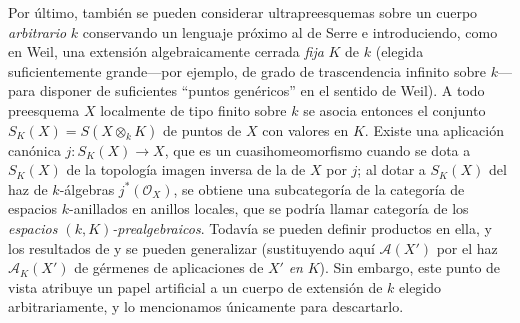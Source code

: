 \begin{env}[10.10.5]
\label{IV.10.10.5}
Por último, también se pueden considerar ultrapreesquemas sobre un cuerpo \emph{arbitrario} $k$
conservando un lenguaje próximo al de Serre e introduciendo, como en Weil, una
extensión algebraicamente cerrada \emph{fija} $K$ de $k$ (elegida suficientemente grande---por ejemplo,
de grado de trascendencia infinito sobre $k$---para disponer de suficientes ``puntos genéricos''
en el sentido de Weil).
A todo preesquema $X$ localmente de tipo finito sobre $k$ se asocia entonces el conjunto
$S_K(X)=S(X\otimes_kK)$
de puntos de $X$ con valores en $K$.
Existe una aplicación canónica $j:S_K(X)\to X$, que es un cuasihomeomorfismo cuando
se dota a $S_K(X)$ de la topología imagen inversa de la de $X$ por $j$; al dotar a $S_K(X)$
del haz de $k$-álgebras $j^*(\mathcal O_X)$, se obtiene una subcategoría de la categoría
de espacios $k$-anillados en anillos locales, que se podría llamar categoría de los
\emph{espacios $(k,K)$-prealgebraicos}.
Todavía se pueden definir productos en ella, y los resultados de  y
 se pueden generalizar (sustituyendo aquí $\mathcal A(X')$ por el haz
$\mathcal A_K(X')$ de gérmenes de aplicaciones de $X'$ \emph{en} $K$).
Sin embargo, este punto de vista atribuye un papel artificial a un cuerpo de extensión
de $k$ elegido arbitrariamente, y lo mencionamos únicamente para descartarlo.
\end{env}
